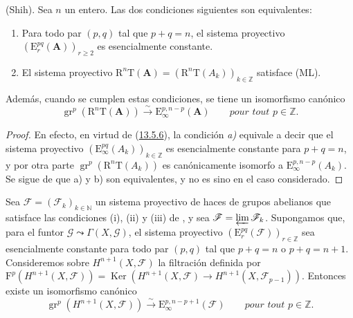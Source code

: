 \begin{proposition}[13.7.4]
\label{0.13.7.4}
\label{0.13.7.4-fr}
(Shih).
Sea $n$ un entero.
Las dos condiciones siguientes son equivalentes:
\begin{enumerate}
  \item[{\rm a)}] Para todo par $(p,q)$ tal que $p+q=n$, el
  sistema proyectivo
  $(\mathrm E_r^{pq}(\mathbf A))_{r\geq2}$ es esencialmente constante.
  \item[{\rm b)}] El sistema proyectivo
  $\mathrm R^n\mathrm T(\mathbf A)=
(\mathrm R^n\mathrm T(A_k))_{k\in\mathbb Z}$ satisface \textup{(ML)}.
\end{enumerate}
Además, cuando se cumplen estas condiciones, se tiene un isomorfismo canónico
\begin{equation}
\label{0.13.7.4.1-fr}
\tag{13.7.4.1}
\operatorname{gr}^p(\mathrm R^n\mathrm T(\mathbf A))
\xrightarrow{\sim}\mathrm E_\infty^{p,n-p}(\mathbf A)
\qquad\textit{pour tout $p\in\mathbb Z$.}
\end{equation}
\end{proposition}
\begin{proof}
En efecto, en virtud de (\hyperref[0.13.5.6-fr]{13.5.6}), la condición \emph{a)} equivale a decir que el sistema proyectivo $(\mathrm E_\infty^{pq}(A_k))_{k\in\mathbb Z}$ es esencialmente constante para $p+q=n$, y por otra parte
$\operatorname{gr}^p(\mathrm R^n\mathrm T(A_k))$ es canónicamente isomorfo a
$\mathrm E_\infty^{p,n-p}(A_k)$.
Se sigue de  que {\rm a)} y {\rm b)} son
equivalentes, y  no es sino
 en el caso considerado.
\end{proof}

\begin{corollary}[13.7.5]
\label{0.13.7.5}
\label{0.13.7.5-fr}
Sea $\boldsymbol{\mathcal F}=(\mathcal F_k)_{k\in\mathbb N}$ un sistema proyectivo de
haces de grupos abelianos que satisface las condiciones {\rm(i)}, {\rm(ii)}
y {\rm(iii)} de , y sea
$\mathcal F=\varprojlim\mathcal F_k$.
Supongamos que, para el funtor
$\mathcal G\leadsto\Gamma(X,\mathcal G)$, el sistema proyectivo $(\mathrm E_r^{pq}(\boldsymbol{\mathcal F}))_{r\in\mathbb Z}$ sea esencialmente constante para todo par $(p,q)$ tal que $p+q=n$ o $p+q=n+1$. Consideremos sobre $H^{n+1}(X,\mathcal F)$ la filtración definida por $\mathrm F^p(H^{n+1}(X,\mathcal F))=
\operatorname{Ker}(H^{n+1}(X,\mathcal F)\to
H^{n+1}(X,\mathcal F_{p-1}))$.
Entonces existe un isomorfismo canónico
\begin{equation}
\label{0.13.7.5.1-fr}
\tag{13.7.5.1}
\operatorname{gr}^p(H^{n+1}(X,\mathcal F))
\xrightarrow{\sim}\mathrm E_\infty^{p,n-p+1}(\boldsymbol{\mathcal F})
\qquad\textit{pour tout $p\in\mathbb Z$.}
\end{equation}
\end{corollary}

